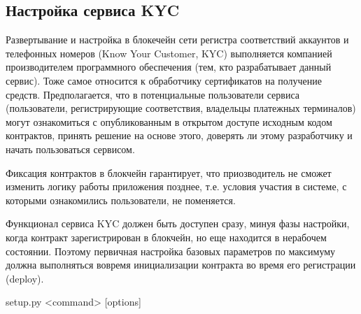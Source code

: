 \subsection*{Настройка сервиса KYC}


Развертывание и настройка в блокечейн сети регистра соответствий аккаунтов и телефонных номеров (Know Your Customer, KYC) выполняется компанией производителем программного обеспечения (тем, кто разрабатывает данный сервис). Тоже самое относится к обработчику сертификатов на получение средств. Предполагается, что в потенциальные пользователи сервиса (пользователи, регистрирующие соответствия, владельцы платежных терминалов) могут ознакомиться с опубликованным в открытом доступе исходным кодом контрактов, принять решение на основе этого, доверять ли этому разработчику и начать пользоваться сервисом.

Фиксация контрактов в блокчейн гарантирует, что приозводитель не сможет изменить логику работы приложения позднее, т.е. условия участия в системе, с которыми ознакомились пользователи, не поменяется.

Функционал сервиса KYC должен быть доступен сразу, минуя фазы настройки, когда контракт зарегистрирован в блокчейн, но еще находится в нерабочем состоянии. Поэтому первичная настройка базовых параметров по максимуму должна выполняться вовремя инициализации контракта во время его регистрации (deploy).

\begin{myverbbox}{\scriptFile}
setup.py <command> [options]
\end{myverbbox}
\scriptTitle






